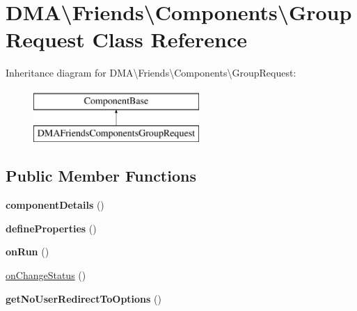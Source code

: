 \hypertarget{classDMA_1_1Friends_1_1Components_1_1GroupRequest}{\section{D\+M\+A\textbackslash{}Friends\textbackslash{}Components\textbackslash{}Group\+Request Class Reference}
\label{classDMA_1_1Friends_1_1Components_1_1GroupRequest}
}
Inheritance diagram for D\+M\+A\textbackslash{}Friends\textbackslash{}Components\textbackslash{}Group\+Request\+:\begin{figure}[H]
\begin{center}
\leavevmode
\includegraphics[height=2.000000cm]{d1/d29/classDMA_1_1Friends_1_1Components_1_1GroupRequest}
\end{center}
\end{figure}
\subsection*{Public Member Functions}
\begin{DoxyCompactItemize}
\item 
\hypertarget{classDMA_1_1Friends_1_1Components_1_1GroupRequest_afb7e37d55f101ec2dfea2af57f09b88d}{{\bfseries component\+Details} ()}\label{classDMA_1_1Friends_1_1Components_1_1GroupRequest_afb7e37d55f101ec2dfea2af57f09b88d}

\item 
\hypertarget{classDMA_1_1Friends_1_1Components_1_1GroupRequest_aa4deec2b8fa31ca4580b1eaf4ff40a4c}{{\bfseries define\+Properties} ()}\label{classDMA_1_1Friends_1_1Components_1_1GroupRequest_aa4deec2b8fa31ca4580b1eaf4ff40a4c}

\item 
\hypertarget{classDMA_1_1Friends_1_1Components_1_1GroupRequest_a78685da9fdb569d6a5a9e30304bb0d22}{{\bfseries on\+Run} ()}\label{classDMA_1_1Friends_1_1Components_1_1GroupRequest_a78685da9fdb569d6a5a9e30304bb0d22}

\item 
\hyperlink{classDMA_1_1Friends_1_1Components_1_1GroupRequest_a809f2ed08437eb0458240725f07d098c}{on\+Change\+Status} ()
\item 
\hypertarget{classDMA_1_1Friends_1_1Components_1_1GroupRequest_adcf888e148f475ac44f05d31060b3762}{{\bfseries get\+No\+User\+Redirect\+To\+Options} ()}\label{classDMA_1_1Friends_1_1Components_1_1GroupRequest_adcf888e148f475ac44f05d31060b3762}

\end{DoxyCompactItemize}
